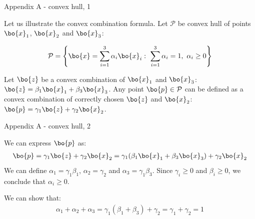 \documentclass{beamer}
\begin{document}
\myqrframe





\begin{frame}{Appendix A - convex hull, 1}
	\begin{flushleft}
		
		
		\begin{figure}[.45\textwidth]
			\centering
			\resizebox{.65\textwidth}{!}
			{}
		\end{figure}
		
		Let us illustrate the convex combination formula. 
		Let $\mathcal{P}$ be convex hull of points $\bo{x}_1$, $\bo{x}_2$ and $\bo{x}_3$:
		
		
		\begin{equation}
			\mathcal{P} = \left \{  \bo{x} = \sum_{i=1}^{3} \alpha_i\bo{x}_i: \   \sum_{i=1}^{3} \alpha_i = 1, \  \alpha_i \geq 0 \right \}
		\end{equation}
		
		Let $\bo{z}$ be a convex combination of $\bo{x}_1$ and $\bo{x}_3$: $\bo{z} = \beta_1 \bo{x}_1 + \beta_3 \bo{x}_3 $. Any point $\bo{p} \in \mathcal{P}$ can be defined as a convex combination of correctly chosen $\bo{z}$ and $\bo{x}_2$: $\bo{p} = \gamma_1 \bo{z} + \gamma_2 \bo{x}_2$.
		
	\end{flushleft}
\end{frame}



\begin{frame}{Appendix A - convex hull, 2}
	\begin{flushleft}
		
		
		
		\begin{figure}[.45\textwidth]
			\centering
			\resizebox{.45\textwidth}{!}
			{}
		\end{figure}
		
		We can express $\bo{p}$ as:
		\begin{align}
			\bo{p} =  \gamma_1 \bo{z} + \gamma_2 \bo{x}_2 
			           = \gamma_1 (\beta_1 \bo{x}_1 + \beta_3 \bo{x}_3 )+ \gamma_2 \bo{x}_2
		\end{align}
		We can define $\alpha_1 = \gamma_1 \beta_1$, $\alpha_2= \gamma_2$ and $\alpha_3 = \gamma_1 \beta_3$. Since $\gamma_i \geq 0$ and $\beta_i \geq 0$, we conclude that $\alpha_i \geq 0$.
		
		\bigskip
		
		We can show that:
		\begin{align}
			\alpha_1 + \alpha_2+\alpha_3 =  \gamma_1(\beta_1 +\beta_3) + \gamma_2 = \gamma_1 + \gamma_2 = 1
		\end{align}
		
		
	\end{flushleft}
\end{frame}
\end{document}
